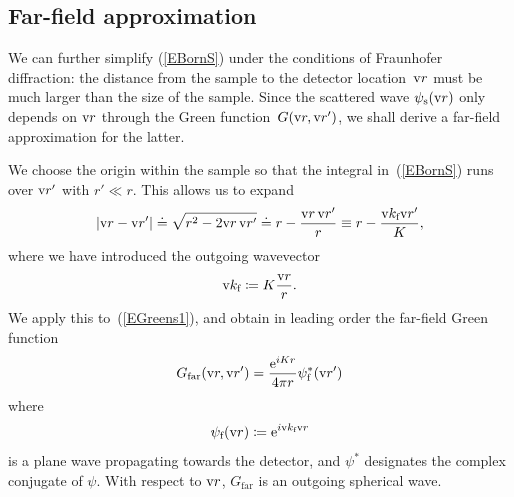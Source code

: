 %

\subsection{Far-field approximation}

%

We can further simplify (\ref{EBornS})
under the conditions of Fraunhofer diffraction:
%
the distance from the sample to the detector location~$\text{v}{r}$
must be much larger than the size of the sample.
Since the scattered wave $\psi_\text{s}(\text{v}{r})$
only depends on $\text{v}{r}$ through the Green function~$G(\text{v}{r},\text{v}{r}')$,
we shall derive a far-field approximation for the latter.

We choose the origin within the sample
so that the integral in~(\ref{EBornS}) runs over $\text{v}{r}'$ with $r'\ll r$.
This allows us to expand
\begin{equation}
  \left|\text{v}{r}-\text{v}{r}'\right|
  \doteq \sqrt{r^2-2\text{v}{r}\,\text{v}{r}'}
  \doteq r - \frac{\text{v}{r}\,\text{v}{r}'}{r}
  \equiv r - \frac{\text{v}{k}_{\text{f}} \text{v}{r}'}{K},
\end{equation}
%
where we have introduced the outgoing wavevector
\begin{equation}
  \text{v}{k}_{\text{f}}\coloneqq K\frac{\text{v}{r}}{r}.
\end{equation}
We apply this to~(\ref{EGreens1}),
%
and obtain in leading order the far-field Green function
\begin{equation}\label{EGreenFar}
  G_\text{far}(\text{v}{r},\text{v}{r}')
  = \frac{\text{e}^{iKr}}{4\pi r}\psi^*_{\text{f}}(\text{v}{r}')
\end{equation}
where
\begin{equation}
  \psi_{\text{f}}(\text{v}{r}) \coloneqq  \text{e}^{i\text{v}{k}_{\text{f}} \text{v}{r}}
\end{equation}
%
is a plane wave propagating towards the detector,
and $\psi^*$ designates the complex conjugate of $\psi$.
With respect to $\text{v}{r}$, $G_\text{far}$ is an outgoing spherical wave.

